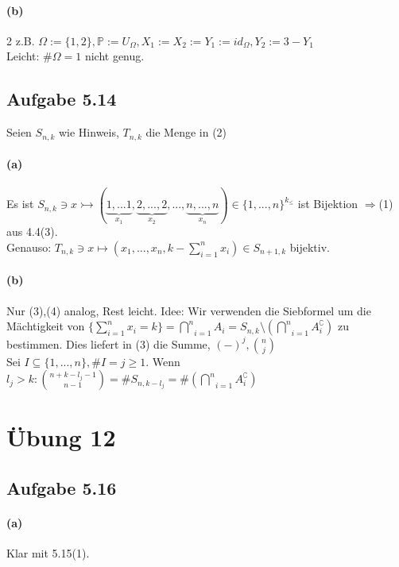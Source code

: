 \documentclass[10pt, a4paper]{article}
\begin{document}
\paragraph{(b)}
2 z.B. $\Omega:=\{1,2\},\mathbb{P}:=U_{\Omega}, X_{1}:=X_{2}:=Y_{1}:=id_{\Omega}, Y_{2}:=3-Y_{1}$	\\
Leicht: $\#\Omega=1$ nicht genug.


\subsection{Aufgabe 5.14}
Seien $S_{n,k}$ wie Hinweis, $T_{n,k}$ die Menge in (2)
\paragraph{(a)}
Es ist $S_{n,k}\ni x\rightarrowtail(\underbrace{1,...1}_{x_{1}},\underbrace{2,...,2}_{x_{2}},...,\underbrace{n,...,n}_{x_{n}})\in\{1,...,n \}^{k_{\leq}}$
ist Bijektion $\Rightarrow$(1) aus 4.4(3).	\\
Genauso:
$T_{n,k}\ni x\mapsto(x_{1},...,x_{n},k-\sum_{i=1}^{n}x_{i})\in S_{n+1,k}$ bijektiv.

\paragraph{(b)}Nur (3),(4) analog, Rest leicht.
Idee: Wir verwenden die Siebformel um die Mächtigkeit von $\{\sum_{i=1}^{n}x_{i}=k \}=\underset{i=1}{\stackrel{n}{\bigcap}}A_{i}=S_{n,k}\setminus(\underset{i=1}{\stackrel{n}{\bigcap}}A_{i}^{\complement})$ zu bestimmen. Dies liefert in (3) die Summe, $(-)^{j},\binom{n}{j}$	\\
Sei $I\subseteq\{1,...,n\}, \#I=j\geq1$.
Wenn$l_{j}>k:\binom{n+k-l_{j}-1}{n-1}=\#S_{n,k-l_{j}}=\#(\underset{i=1}{\stackrel{n}{\bigcap}}A_{i}^{\complement})$


\section{Übung 12}
\subsection{Aufgabe 5.16}
\paragraph*{(a)}
Klar mit 5.15(1).
\end{document}
